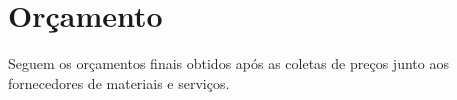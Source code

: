 \documentclass[	DIV=calc,%
							paper=a4,%
							fontsize=12pt,%
							onecolumn]{scrartcl}	 					%
\begin{document}
\section{Orçamento}
{\raggedright Seguem os orçamentos finais obtidos após as coletas de preços junto aos fornecedores de materiais e serviços.
}





\end{document}
